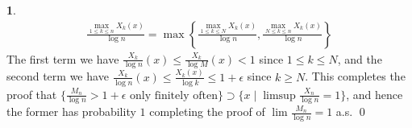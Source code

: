 \documentclass[10.5pt]{article}
\theoremstyle{definition}
\newtheorem{pb}{}
\newcommand{\set}[1]{\{#1\}}
\begin{document}
\begin{pb}
        \begin{align*}
            \frac{\max_{1 \leq k \leq n}X_k(x)}{\log n} = \max\left\{\frac{\max_{1 \leq k \leq N}X_k(x)}{\log n}, \frac{\max_{N \leq k \leq n}X_k(x)}{\log n}\right\}
        \end{align*}
        The first term we have \(\frac{X_k}{\log n}(x) \leq \frac{X_k}{\log M}(x) < 1\) since \(1 \leq k \leq N\), and the second term we have \(\frac{X_k}{\log n}(x) \leq \frac{X_k(x)}{\log k} \leq 1 + \epsilon\) since \(k \geq N\). This completes the proof that \(\set{\frac{M_n}{\log n} > 1 + \epsilon \text{ only finitely often}} \supset \set{x \mid \limsup \frac{X_n}{\log n} = 1}\), and hence the former has probability \(1\) completing the proof of \(\lim \frac{M_n}{\log n} = 1\) a.s. \qed
    \end{pb}
\end{document}
